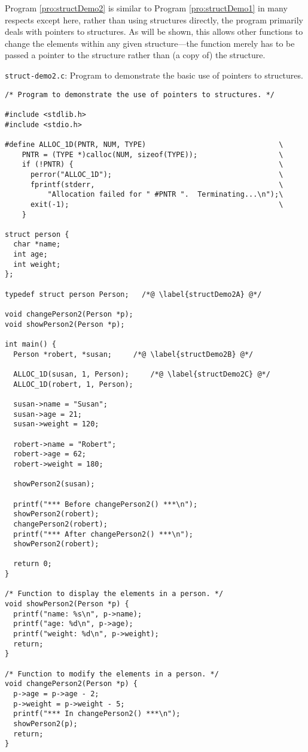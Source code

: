 Program \ref{pro:structDemo2} is similar to Program
\ref{pro:structDemo1} in many respects except here, rather than using
structures directly, the program primarily deals with pointers to
structures.  As will be shown, this allows other functions to change
the elements within any given structure---the function merely has to
be passed a pointer to the structure rather than (a copy of) the
structure.
\begin{program} {\tt struct-demo2.c}: Program to demonstrate the basic
  use of pointers to structures.
 \label{pro:structDemo2}
\codemiddle
\begin{lstlisting}
/* Program to demonstrate the use of pointers to structures. */

#include <stdlib.h>
#include <stdio.h>

#define ALLOC_1D(PNTR, NUM, TYPE)                               \
    PNTR = (TYPE *)calloc(NUM, sizeof(TYPE));                   \
    if (!PNTR) {                                                \
      perror("ALLOC_1D");                                       \
      fprintf(stderr,                                           \
          "Allocation failed for " #PNTR ".  Terminating...\n");\
      exit(-1);                                                 \
    }

struct person {
  char *name;
  int age;
  int weight;
};

typedef struct person Person;   /*@ \label{structDemo2A} @*/

void changePerson2(Person *p);
void showPerson2(Person *p);  

int main() {
  Person *robert, *susan;     /*@ \label{structDemo2B} @*/

  ALLOC_1D(susan, 1, Person);     /*@ \label{structDemo2C} @*/
  ALLOC_1D(robert, 1, Person);

  susan->name = "Susan";
  susan->age = 21;
  susan->weight = 120;

  robert->name = "Robert";
  robert->age = 62;
  robert->weight = 180;

  showPerson2(susan);
  
  printf("*** Before changePerson2() ***\n");
  showPerson2(robert);
  changePerson2(robert);
  printf("*** After changePerson2() ***\n");
  showPerson2(robert);

  return 0;
}

/* Function to display the elements in a person. */
void showPerson2(Person *p) {
  printf("name: %s\n", p->name);
  printf("age: %d\n", p->age);
  printf("weight: %d\n", p->weight);
  return;
}

/* Function to modify the elements in a person. */
void changePerson2(Person *p) {
  p->age = p->age - 2;
  p->weight = p->weight - 5;
  printf("*** In changePerson2() ***\n");
  showPerson2(p);
  return;
}
\end{lstlisting}
\end{program}
